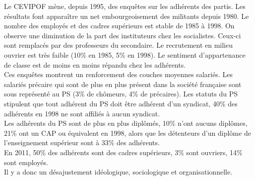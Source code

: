 \documentclass[10pt, a4paper, openany]{book}
\begin{document}
Le CEVIPOF mène, depuis 1995, des enquêtes sur les adhérents des partis. Les résultats font apparaître un net embourgeoisement des militants depuis 1980. Le nombre des employés et des cadres supérieurs est stable de 1985 à 1998. On observe une diminution de la part des instituteurs chez les socialistes. Ceux-ci sont remplacés par des professeurs du secondaire. Le recrutement en milieu ouvrier est très faible (10\% en 1985, 5\% en 1998). Le sentiment d'appartenance de classe est de moins en moins répandu chez les adhérents. \\
Ces enquêtes montrent un renforcement des couches moyennes salariés. Les salariés précaire qui sont de plus en plus présent dans la société française sont sous représenté au PS (3\% de chômeurs, 4\% de précaires). Les statuts du PS stipulent que tout adhérent du PS doit être adhérent d'un syndicat, 40\% des adhérents en 1998 ne sont affiliés à aucun syndicat. \\
Les adhérents du PS sont de plus en plus diplômés, 10\% n'ont aucuns diplômes, 21\% ont un CAP ou équivalent en 1998, alors que les détenteurs d'un diplôme de l'enseignement supérieur sont à 33\% des adhérents. \\
En 2011, 50\% des adhérents sont des cadres supérieurs, 3\% sont ouvriers, 14\% sont employés. \\
Il y a donc un désajustement idéologique, sociologique et organisationnelle. 
\end{document}
